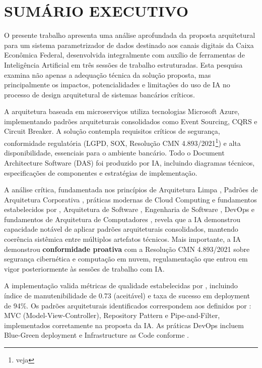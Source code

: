 \chapter{SUMÁRIO EXECUTIVO}

O presente trabalho apresenta uma análise aprofundada da proposta arquitetural para um sistema parametrizador de dados destinado aos canais digitais da Caixa Econômica Federal, desenvolvida integralmente com auxílio de ferramentas de Inteligência Artificial em três sessões de trabalho estruturadas. Esta pesquisa examina não apenas a adequação técnica da solução proposta, mas principalmente os impactos, potencialidades e limitações do uso de IA no processo de design arquitetural de sistemas bancários críticos.

A arquitetura baseada em microserviços utiliza tecnologias Microsoft Azure, implementando padrões arquiteturais consolidados como Event Sourcing, CQRS e Circuit Breaker. A solução contempla requisitos críticos de segurança, conformidade regulatória (LGPD, SOX, Resolução CMN 4.893/2021\footnote{veja }) e alta disponibilidade, essenciais para o ambiente bancário. Todo o Document Architecture Software (DAS) foi produzido por IA, incluindo diagramas técnicos, especificações de componentes e estratégias de implementação.

A análise crítica, fundamentada nos princípios de Arquitetura Limpa , Padrões de Arquitetura Corporativa , práticas modernas de Cloud Computing  e fundamentos estabelecidos por , Arquitetura de Software , Engenharia de Software , DevOps  e fundamentos de Arquitetura de Computadores , revela que a IA demonstrou capacidade notável de aplicar padrões arquiteturais consolidados, mantendo coerência sistêmica entre múltiplos artefatos técnicos. Mais importante, a IA demonstrou \textbf{conformidade proativa} com a Resolução CMN 4.893/2021\nocite{BCB_CMN_4893} sobre segurança cibernética e computação em nuvem, regulamentação que entrou em vigor posteriormente às sessões de trabalho com IA.

A implementação valida métricas de qualidade estabelecidas por , incluindo índice de manutenibilidade de 0.73 (aceitável) e taxa de sucesso em deployment de 94\%. Os padrões arquiteturais identificados correspondem aos definidos por : MVC (Model-View-Controller), Repository Pattern e Pipe-and-Filter, implementados corretamente na proposta da IA. As práticas DevOps incluem Blue-Green deployment e Infrastructure as Code conforme .

